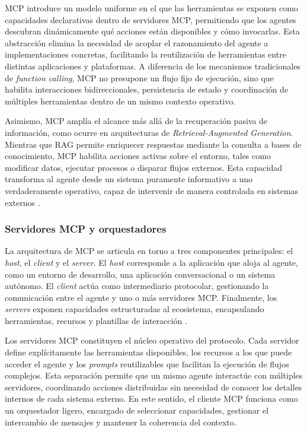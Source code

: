 \documentclass[
	spanish, %
	letterpaper, oneside
]{book}
\begin{document}
MCP introduce un modelo uniforme en el que las herramientas se exponen como capacidades declarativas dentro de servidores MCP, permitiendo que los agentes descubran dinámicamente qué acciones están disponibles y cómo invocarlas. Esta abstracción elimina la necesidad de acoplar el razonamiento del agente a implementaciones concretas, facilitando la reutilización de herramientas entre distintas aplicaciones y plataformas. A diferencia de los mecanismos tradicionales de \emph{function calling}, MCP no presupone un flujo fijo de ejecución, sino que habilita interacciones bidireccionales, persistencia de estado y coordinación de múltiples herramientas dentro de un mismo contexto operativo.

Asimismo, MCP amplía el alcance más allá de la recuperación pasiva de información, como ocurre en arquitecturas de \emph{Retrieval-Augmented Generation}. Mientras que RAG permite enriquecer respuestas mediante la consulta a bases de conocimiento, MCP habilita acciones activas sobre el entorno, tales como modificar datos, ejecutar procesos o disparar flujos externos. Esta capacidad transforma al agente desde un sistema puramente informativo a uno verdaderamente operativo, capaz de intervenir de manera controlada en sistemas externos \cite{hou2025mcp}.

\subsubsection{Servidores MCP y orquestadores}

La arquitectura de MCP se articula en torno a tres componentes principales: el \emph{host}, el \emph{client} y el \emph{server}. El \emph{host} corresponde a la aplicación que aloja al agente, como un entorno de desarrollo, una aplicación conversacional o un sistema autónomo. El \emph{client} actúa como intermediario protocolar, gestionando la comunicación entre el agente y uno o más servidores MCP. Finalmente, los \emph{servers} exponen capacidades estructuradas al ecosistema, encapsulando herramientas, recursos y plantillas de interacción \cite{hou2025mcp}.

Los servidores MCP constituyen el núcleo operativo del protocolo. Cada servidor define explícitamente las herramientas disponibles, los recursos a los que puede acceder el agente y los \emph{prompts} reutilizables que facilitan la ejecución de flujos complejos. Esta separación permite que un mismo agente interactúe con múltiples servidores, coordinando acciones distribuidas sin necesidad de conocer los detalles internos de cada sistema externo. En este sentido, el cliente MCP funciona como un orquestador ligero, encargado de seleccionar capacidades, gestionar el intercambio de mensajes y mantener la coherencia del contexto.
\end{document}
